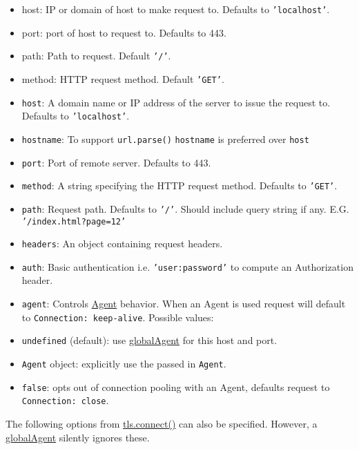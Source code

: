 \begin{itemize}
\item
  host: IP or domain of host to make request to. Defaults to
  \texttt{'localhost'}.
\item
  port: port of host to request to. Defaults to 443.
\item
  path: Path to request. Default \texttt{'/'}.
\item
  method: HTTP request method. Default \texttt{'GET'}.
\item
  \texttt{host}: A domain name or IP address of the server to issue the
  request to. Defaults to \texttt{'localhost'}.
\item
  \texttt{hostname}: To support \texttt{url.parse()} \texttt{hostname}
  is preferred over \texttt{host}
\item
  \texttt{port}: Port of remote server. Defaults to 443.
\item
  \texttt{method}: A string specifying the HTTP request method. Defaults
  to \texttt{'GET'}.
\item
  \texttt{path}: Request path. Defaults to \texttt{'/'}. Should include
  query string if any. E.G. \texttt{'/index.html?page=12'}
\item
  \texttt{headers}: An object containing request headers.
\item
  \texttt{auth}: Basic authentication i.e. \texttt{'user:password'} to
  compute an Authorization header.
\item
  \texttt{agent}: Controls \hyperref[https_class_https_agent]{Agent}
  behavior. When an Agent is used request will default to
  \texttt{Connection: keep-alive}. Possible values:
\item
  \texttt{undefined} (default): use
  \hyperref[https_https_globalagent]{globalAgent} for this host and
  port.
\item
  \texttt{Agent} object: explicitly use the passed in \texttt{Agent}.
\item
  \texttt{false}: opts out of connection pooling with an Agent, defaults
  request to \texttt{Connection: close}.
\end{itemize}

The following options from
\href{tls.html\#tls\_tls\_connect\_options\_secureconnectlistener}{tls.connect()}
can also be specified. However, a
\hyperref[https_https_globalagent]{globalAgent} silently ignores
these.


